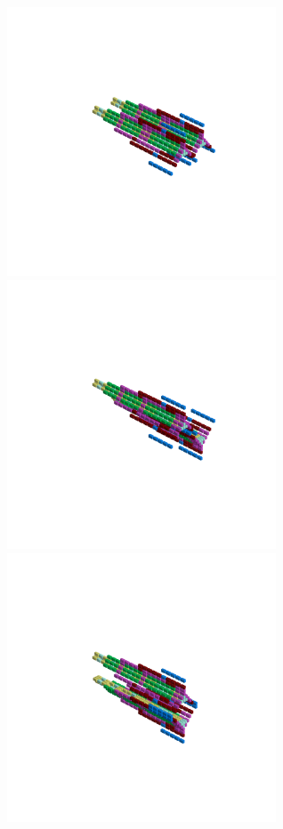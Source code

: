 \begin{minipage}[b]{0.50\linewidth}                                       
  \begin{figure}[H]
      \centering
        \vspace*{-1cm}
        \hspace*{-2cm}
        \includegraphics[width=8cm]{src/symmetries/pattern4_1-45.png}%
        \hspace*{-4cm}
        \includegraphics[width=8cm]{src/symmetries/pattern4_2-45.png}\\
        \vspace*{-5cm}
        \hspace*{-3cm}
        \includegraphics[width=8cm]{src/symmetries/pattern4_3-45.png}\\

\end{figure}
\end{minipage}
